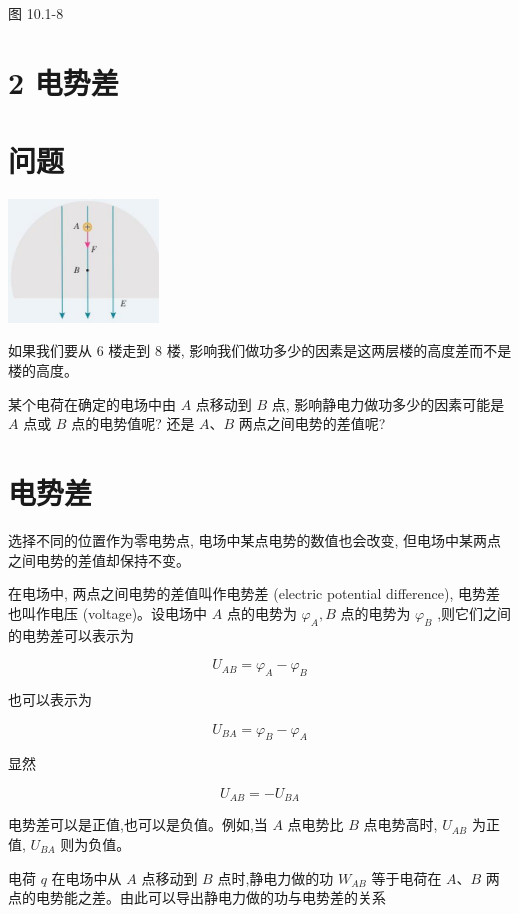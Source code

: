\documentclass[10pt]{article}
\begin{document}
图 10.1-8

\section*{2 电势差}

\section*{问题}

\begin{center}
\includegraphics[max width=0.3\textwidth]{images/01911d5f-8e38-70c0-b5b8-2b399bd115b6_36_747135.jpg}
\end{center}

如果我们要从 6 楼走到 8 楼, 影响我们做功多少的因素是这两层楼的高度差而不是楼的高度。

某个电荷在确定的电场中由 \(A\) 点移动到 \(B\) 点, 影响静电力做功多少的因素可能是 \(A\) 点或 \(B\) 点的电势值呢? 还是 \(A\text{、}B\) 两点之间电势的差值呢?

\section*{电势差}

选择不同的位置作为零电势点, 电场中某点电势的数值也会改变, 但电场中某两点之间电势的差值却保持不变。

在电场中, 两点之间电势的差值叫作电势差 (electric potential difference), 电势差也叫作电压 (voltage)。设电场中 \(A\) 点的电势为 \({\varphi }_{A},B\) 点的电势为 \({\varphi }_{B}\) ,则它们之间的电势差可以表示为

\[
{U}_{AB} = {\varphi }_{A} - {\varphi }_{B}
\]

也可以表示为

\[
{U}_{BA} = {\varphi }_{B} - {\varphi }_{A}
\]

显然

\[
{U}_{AB} = - {U}_{BA}
\]

电势差可以是正值,也可以是负值。例如,当 \(A\) 点电势比 \(B\) 点电势高时, \({U}_{AB}\) 为正值, \({U}_{BA}\) 则为负值。

电荷 \(q\) 在电场中从 \(A\) 点移动到 \(B\) 点时,静电力做的功 \({W}_{AB}\) 等于电荷在 \(A\text{、}B\) 两点的电势能之差。由此可以导出静电力做的功与电势差的关系
\end{document}
